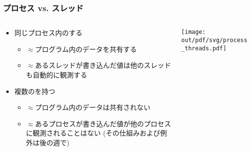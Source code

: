 \documentclass[12pt,dvipdfmx]{beamer}
\begin{document}
\begin{frame}
  \frametitle{プロセス vs. スレッド}
  \begin{columns}
    \begin{column}{0.7\textwidth}
      \begin{itemize}
      \item 同じプロセス内のする
        \begin{itemize}
        \item $\approx$プログラム内のデータを共有する
        \item $\approx$あるスレッドが書き込んだ値は他のスレッドも自動的に観測する
        \end{itemize}
      \item 複数のを持つ
        \begin{itemize}
        \item $\approx$プログラム内のデータは共有されない
        \item $\approx$あるプロセスが書き込んだ値が他のプロセスに観測されることはない
          (その仕組みおよび例外は後の週で)
        \end{itemize}
      \end{itemize}
    \end{column}
    \begin{column}{0.3\textwidth}
      \texttt{[image: out/pdf/svg/process\_threads.pdf]}
    \end{column}
  \end{columns}
\end{frame}

  
\end{document}
